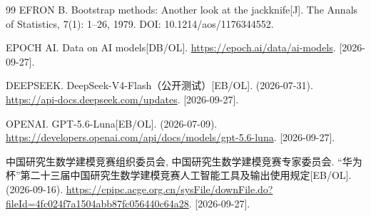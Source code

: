\begin{thebibliography}{99}
 EFRON B. Bootstrap methods: Another look at the jackknife[J]. The Annals of Statistics, 7(1): 1--26, 1979. DOI: 10.1214/aos/1176344552.

 EPOCH AI. Data on AI models[DB/OL]. \url{https://epoch.ai/data/ai-models}. [2026-09-27].

 DEEPSEEK. DeepSeek-V4-Flash（公开测试）[EB/OL]. (2026-07-31). \url{https://api-docs.deepseek.com/updates}. [2026-09-27].

 OPENAI. GPT-5.6-Luna[EB/OL]. (2026-07-09). \url{https://developers.openai.com/api/docs/models/gpt-5.6-luna}. [2026-09-27].

 中国研究生数学建模竞赛组织委员会, 中国研究生数学建模竞赛专家委员会. “华为杯”第二十三届中国研究生数学建模竞赛人工智能工具及输出使用规定[EB/OL]. (2026-09-16). \url{https://cpipc.acge.org.cn/sysFile/downFile.do?fileId=4fc024f7a1504abb87fc056440c64a28}. [2026-09-27].

\end{thebibliography}
